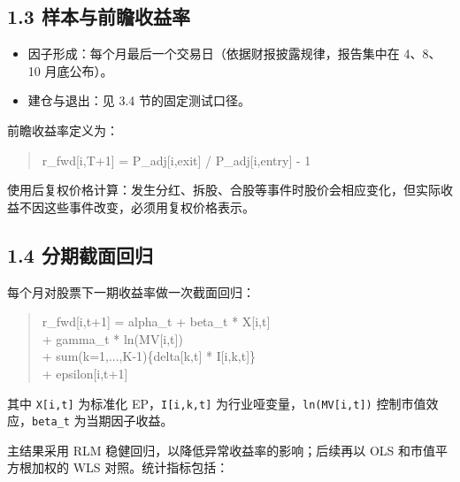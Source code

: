 \documentclass[UTF8,a4paper,11pt]{ctexart}
\begin{document}
{}
\subsection*{1.3 样本与前瞻收益率}

\begin{itemize}[leftmargin=2em,itemsep=2pt,topsep=3pt]
\item 
因子形成：每个月最后一个交易日（依据财报披露规律，报告集中在 4、8、10 月底公布）。

\item 
建仓与退出：见 3.4 节的固定测试口径。

\end{itemize}

前瞻收益率定义为：

\begin{quote}\ttfamily\small
r\_fwd[i,T+1] = P\_adj[i,exit] / P\_adj[i,entry] - 1\\
\end{quote}

使用后复权价格计算：发生分红、拆股、合股等事件时股价会相应变化，但实际收益不因这些事件改变，必须用复权价格表示。

{}
\subsection*{1.4 分期截面回归}

每个月对股票下一期收益率做一次截面回归：

\begin{quote}\ttfamily\small
r\_fwd[i,t+1] = alpha\_t + beta\_t * X[i,t]\\
             + gamma\_t * ln(MV[i,t])\\
             + sum(k=1,...,K-1)\{delta[k,t] * I[i,k,t]\}\\
             + epsilon[i,t+1]\\
\end{quote}

其中 \texttt{X[i,t]} 为标准化 EP，\texttt{I[i,k,t]} 为行业哑变量，\texttt{ln(MV[i,t])} 控制市值效应，\texttt{beta\_t} 为当期因子收益。

主结果采用 RLM 稳健回归，以降低异常收益率的影响；后续再以 OLS 和市值平方根加权的 WLS 对照。统计指标包括：
\end{document}
